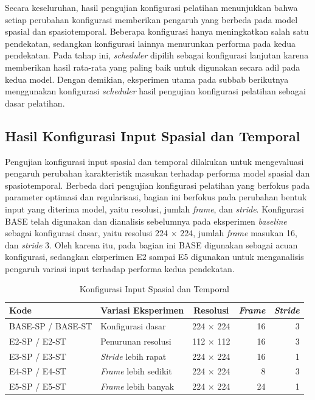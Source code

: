 Secara keseluruhan, hasil pengujian konfigurasi pelatihan menunjukkan bahwa setiap perubahan konfigurasi memberikan pengaruh yang berbeda pada model spasial dan spasiotemporal. Beberapa konfigurasi hanya meningkatkan salah satu pendekatan, sedangkan konfigurasi lainnya menurunkan performa pada kedua pendekatan. Pada tahap ini, \textit{scheduler} dipilih sebagai konfigurasi lanjutan karena memberikan hasil rata-rata yang paling baik untuk digunakan secara adil pada kedua model. Dengan demikian, eksperimen utama pada subbab berikutnya menggunakan konfigurasi \textit{scheduler} hasil pengujian konfigurasi pelatihan sebagai dasar pelatihan.

\subsection{Hasil Konfigurasi Input Spasial dan Temporal} \label{IV.Eksperimen_Utama}

Pengujian konfigurasi input spasial dan temporal dilakukan untuk mengevaluasi pengaruh perubahan karakteristik masukan terhadap performa model spasial dan spasiotemporal. Berbeda dari pengujian konfigurasi pelatihan yang berfokus pada parameter optimasi dan regularisasi, bagian ini berfokus pada perubahan bentuk input yang diterima model, yaitu resolusi, jumlah \textit{frame}, dan \textit{stride}. Konfigurasi BASE telah digunakan dan dianalisis sebelumnya pada eksperimen \textit{baseline} sebagai konfigurasi dasar, yaitu resolusi 224 $\times$ 224, jumlah \textit{frame} masukan 16, dan \textit{stride} 3. Oleh karena itu, pada bagian ini BASE digunakan sebagai acuan konfigurasi, sedangkan eksperimen E2 sampai E5 digunakan untuk menganalisis pengaruh variasi input terhadap performa kedua pendekatan.

\begin{table}[htbp]
\centering
\caption{Konfigurasi Input Spasial dan Temporal}
\label{table:4.eksperimen-utama-config}
\begin{tabular}{llcrr}
\toprule
\textbf{Kode} &
\textbf{Variasi Eksperimen} &
\textbf{Resolusi} &
\textbf{\textit{Frame}} &
\textbf{\textit{Stride}} \\
\midrule
BASE-SP / BASE-ST & Konfigurasi dasar & 224 $\times$ 224 & 16 & 3 \\
E2-SP / E2-ST & Penurunan resolusi & 112 $\times$ 112 & 16 & 3 \\
E3-SP / E3-ST & \textit{Stride} lebih rapat & 224 $\times$ 224 & 16 & 1 \\
E4-SP / E4-ST & \textit{Frame} lebih sedikit & 224 $\times$ 224 & 8 & 3 \\
E5-SP / E5-ST & \textit{Frame} lebih banyak & 224 $\times$ 224 & 24 & 1 \\
\bottomrule
\end{tabular}
\end{table}

